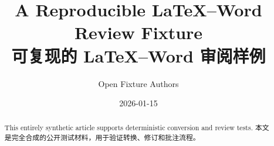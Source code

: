 \documentclass[11pt]{article}
\title{A Reproducible LaTeX--Word Review Fixture\\可复现的 LaTeX--Word 审阅样例}
\author{Open Fixture Authors}
\date{2026-01-15}
\begin{document}
\maketitle

\begin{abstract}
This entirely synthetic article supports deterministic conversion and review
tests. 本文是完全合成的公开测试材料，用于验证转换、修订和批注流程。
\end{abstract}







\end{document}
